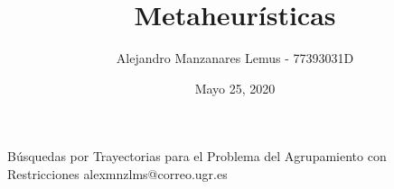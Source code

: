 \documentclass[10pt]{report}
\author{Alejandro Manzanares Lemus - 77393031D}
\title{Metaheurísticas}
\date{Mayo 25, 2020}
\begin{document}
				{Búsquedas por Trayectorias para el Problema del Agrupamiento con Restricciones}
            {alexmnzlms@correo.ugr.es}

\tableofcontents

% 
% 
% 
% 
% 

% 
% 
% 
% 
% 
% 
% 
% 
% 
% 
% 




% 
% 





% 


















\end{document}
